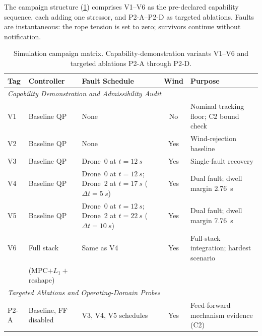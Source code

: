 The campaign structure (\cref{tab:campaign-matrix}) comprises V1--V6 as the pre-declared capability sequence, each adding one stressor, and P2-A--P2-D as targeted ablations. Faults are instantaneous: the rope tension is set to zero; survivors continue without notification.

\begin{table}[htbp]
  \caption{Simulation campaign matrix. Capability-demonstration variants V1--V6 and targeted ablations P2-A through P2-D.}
  \label{tab:campaign-matrix}
  \centering
  \begin{tabular}{llp{5.5cm}cp{5cm}}
    \toprule
    Tag & Controller            & Fault Schedule                                                                          & Wind & Purpose \\
    \midrule
    \multicolumn{5}{l}{\textit{Capability Demonstration and Admissibility Audit}} \\[\smallskipamount]
    V1 & Baseline QP           & None                                                                                    & No   & Nominal tracking floor; C2 bound check \\
    V2 & Baseline QP           & None                                                                                    & Yes  & Wind-rejection baseline \\
    V3 & Baseline QP           & Drone~0 at $t{=}\SI{12}{s}$                                                             & Yes  & Single-fault recovery \\
    V4 & Baseline QP           & Drone~0 at $t{=}\SI{12}{s}$; Drone~2 at $t{=}\SI{17}{s}$ \mbox{($\Delta t{=}\SI{5}{s}$)}  & Yes  & Dual fault; dwell margin \SI{2.76}{s} \\
    V5 & Baseline QP           & Drone~0 at $t{=}\SI{12}{s}$; Drone~2 at $t{=}\SI{22}{s}$ \mbox{($\Delta t{=}\SI{10}{s}$)} & Yes  & Dual fault; dwell margin \SI{7.76}{s} \\
    V6 & Full stack            & Same as V4                                                                              & Yes  & Full-stack integration; hardest scenario \\
       & (MPC$+L_1+$reshape)  &                                                                                         &      & \\
    \midrule
    \multicolumn{5}{l}{\textit{Targeted Ablations and Operating-Domain Probes}} \\[\smallskipamount]
    P2-A & Baseline, FF disabled & V3, V4, V5 schedules                                                                 & Yes  & Feed-forward mechanism evidence (C2) \\

\end{tabular}
\end{table}
